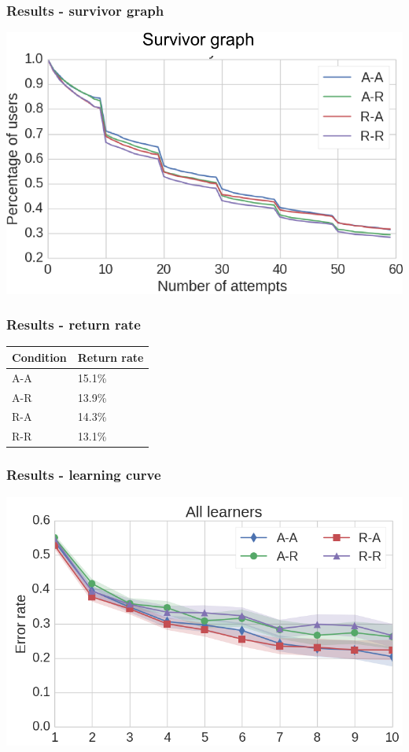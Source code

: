 \documentclass[xcolor=svgnames]{beamer}
\begin{document}
\begin{frame}
	\frametitle{Results - survivor graph}
   \includegraphics[width=\textwidth]{img/survivor-hack-raw.png}
\end{frame}
\begin{frame}
	\frametitle{Results - return rate}
\begin{table}
  \centering
  \label{tab:return-prob}
  \begin{tabular}{ll}
    \toprule
    Condition & Return rate \\
    \midrule
    A-A & 	15.1\% \\
    A-R & 	13.9\% \\
    R-A & 	14.3\% \\
    R-R & 	13.1\% \\
    \bottomrule
  \end{tabular}
\end{table}
\end{frame}
\begin{frame}
	\frametitle{Results - learning curve}
   \includegraphics[width=\textwidth]{img/learning_curves_all.png}
\end{frame}
\end{document}
